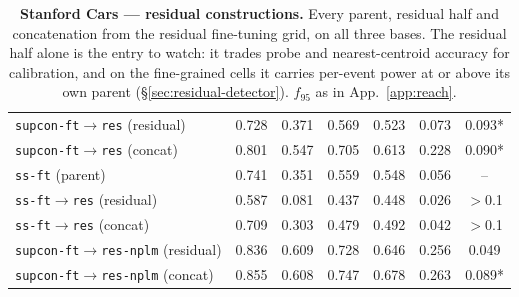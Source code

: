 \documentclass{article}
\begin{document}
\begin{table}[p]
\begin{tabular}{lcccccc}
\texttt{supcon-ft$\to$res} (residual) & 0.728 & 0.371 & 0.569 & 0.523 & 0.073 & 0.093* \\
\texttt{supcon-ft$\to$res} (concat) & 0.801 & 0.547 & 0.705 & 0.613 & 0.228 & 0.090* \\
\texttt{ss-ft} (parent) & 0.741 & 0.351 & 0.559 & 0.548 & 0.056 & -- \\
\texttt{ss-ft$\to$res} (residual) & 0.587 & 0.081 & 0.437 & 0.448 & 0.026 & $>$0.1 \\
\texttt{ss-ft$\to$res} (concat) & 0.709 & 0.303 & 0.479 & 0.492 & 0.042 & $>$0.1 \\
\texttt{supcon-ft$\to$res-nplm} (residual) & 0.836 & 0.609 & 0.728 & 0.646 & 0.256 & 0.049 \\
\texttt{supcon-ft$\to$res-nplm} (concat) & 0.855 & 0.608 & 0.747 & 0.678 & 0.263 & 0.089* \\
\bottomrule
\end{tabular}
\caption{\textbf{Stanford Cars --- residual constructions.} Every parent, residual half
and concatenation from the residual fine-tuning grid, on all three bases.
The residual half alone is the entry to watch: it trades probe and
nearest-centroid accuracy for calibration, and on the fine-grained cells it
carries per-event power at or above its own parent
(\S\ref{sec:residual-detector}). $f_{95}$ as in App.~\ref{app:reach}.}
\label{tab:res-cars}
\end{table}
\end{document}
